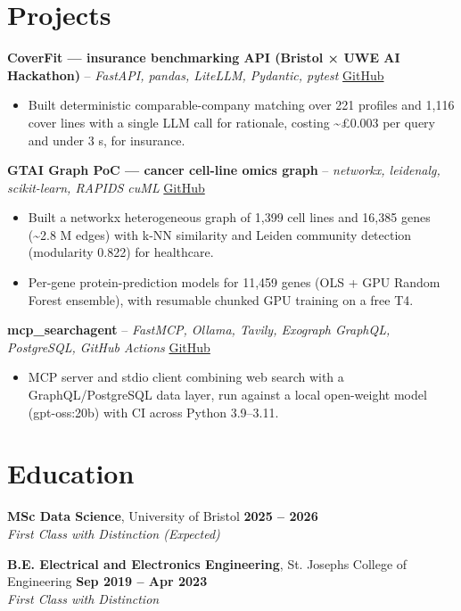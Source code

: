 \documentclass[a4paper,11pt]{article}
\begin{document}
\section{Projects}
\noindent\textbf{CoverFit — insurance benchmarking API (Bristol × UWE AI Hackathon)} -- \textit{FastAPI, pandas, LiteLLM, Pydantic, pytest} \hfill \href{https://github.com/Thiruvel-AP/AIHackathon-Phoenix}{GitHub}
\begin{itemize}
  \item Built deterministic comparable-company matching over 221 profiles and 1,116 cover lines with a single LLM call for rationale, costing \textasciitilde{}£0.003 per query and under 3 s, for insurance.
\end{itemize}
\vspace{3pt}
\noindent\textbf{GTAI Graph PoC — cancer cell-line omics graph} -- \textit{networkx, leidenalg, scikit-learn, RAPIDS cuML} \hfill \href{https://github.com/Thiruvel-AP/GTAI-GraphPOC}{GitHub}
\begin{itemize}
  \item Built a networkx heterogeneous graph of 1,399 cell lines and 16,385 genes (\textasciitilde{}2.8 M edges) with k-NN similarity and Leiden community detection (modularity 0.822) for healthcare.
  \item Per-gene protein-prediction models for 11,459 genes (OLS + GPU Random Forest ensemble), with resumable chunked GPU training on a free T4.
\end{itemize}
\vspace{3pt}
\noindent\textbf{mcp\_searchagent} -- \textit{FastMCP, Ollama, Tavily, Exograph GraphQL, PostgreSQL, GitHub Actions} \hfill \href{https://github.com/Thiruvel-AP/mcp_searchagent}{GitHub}
\begin{itemize}
  \item MCP server and stdio client combining web search with a GraphQL/PostgreSQL data layer, run against a local open-weight model (gpt-oss:20b) with CI across Python 3.9–3.11.
\end{itemize}

\section{Education}
\textbf{MSc Data Science}, University of Bristol \hfill \textbf{2025 – 2026}\\ \textit{First Class with Distinction (Expected)}\par
\vspace{3pt}
\textbf{B.E. Electrical and Electronics Engineering}, St. Joseph\textquotesingle{}s College of Engineering \hfill \textbf{Sep 2019 – Apr 2023}\\ \textit{First Class with Distinction}\par
\end{document}
